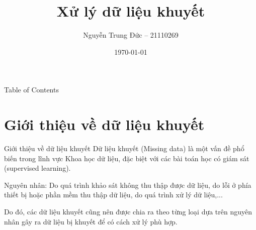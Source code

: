 \documentclass[aspectratio=169, 10pt]{beamer} %
\title[xử lý dữ liệu khuyết]{\huge Xử lý dữ liệu khuyết}
\author[Nguyễn Trung Đức]{
    Nguyễn Trung Đức -- 21110269
}
\institute[HCMUS]{
    \inst{}
    \normalsize{Khoa Toán - Tin học, Trường Đại học Khoa học Tự nhiên}
}
\date{\small\vspace{-.25in}\today}
\begin{document}
\newtheorem{thm}{Định lý}[section]
\newtheorem{lem}{Bổ đề}[section]
\newtheorem{defi}{Định nghĩa}[section]
\newtheorem{prop}{Mệnh đề}[section]
\newtheorem{assume}{Giả thiết}[section]
\newtheorem{remark}{Nhận xét}[section]
\newtheorem{ex}{Ví dụ}[section]



\begin{frame}[plain] %
    \maketitle 
\end{frame}

\begin{frame}{Table of Contents}
    \tableofcontents[subsectionstyle=hide, subsubsectionstyle=hide]
\end{frame}

\section{Giới thiệu về dữ liệu khuyết}
\begin{frame}{Giới thiệu về dữ liệu khuyết}
    Dữ liệu khuyết (Missing data) là một vấn đề phổ biến trong lĩnh vực Khoa học dữ liệu, đặc biệt với các bài toán học có giám sát (supervised learning).

    Nguyên nhân: Do quá trình khảo sát không thu thập được dữ liệu, do lỗi ở phía thiết bị hoặc phần mềm thu thập dữ liệu, do quá trình xử lý dữ liệu,...

    Do đó, các dữ liệu khuyết cũng nên được chia ra theo từng loại dựa trên nguyên nhân gây ra dữ liệu bị khuyết để có cách xử lý phù hợp.
\end{frame}
\end{document}
